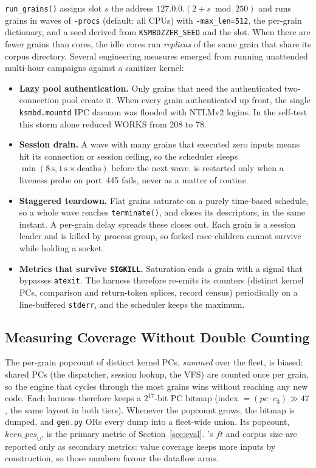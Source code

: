 \documentclass{article}
\begin{document}
\texttt{run\_grains()} assigns slot $s$ the address
$127.0.0.(2 + s \bmod 250)$ and runs grains in waves of \texttt{-procs}
(default: all CPUs) with \texttt{-max\_len=512}, the per-grain dictionary,
and a seed derived from \texttt{KSMBDZZER\_SEED} and the slot. When there
are fewer grains than cores, the idle cores run \emph{replicas} of the same
grain that share its corpus directory. Several engineering measures emerged
from running unattended multi-hour campaigns against a sanitizer kernel:
\begin{itemize}[nosep]
  \item \textbf{Lazy pool authentication.} Only grains that need the
        authenticated two-connection pool create it. When every grain
        authenticated up front, the single \texttt{ksmbd.mountd} IPC daemon
        was flooded with NTLMv2 logins. In the self-test this storm alone
        reduced WORKS from 208 to 78.
  \item \textbf{Session drain.} A wave with many grains that executed zero
        inputs means \ksmbd hit its connection or session ceiling, so the
        scheduler sleeps $\min(8\,\mathrm{s}, 1\,\mathrm{s} \times \text{deaths})$
        before the next wave. \ksmbd is restarted only when a liveness probe
        on port~445 fails, never as a matter of routine.
  \item \textbf{Staggered teardown.} Flat grains saturate on a purely
        time-based schedule, so a whole wave reaches \texttt{terminate()}, and
        closes its \kcovdf descriptors, in the same instant. A per-grain
        delay spreads these closes out. Each grain is a session leader and is
        killed by process group, so forked race children cannot survive while
        holding a \ksmbd socket.
  \item \textbf{Metrics that survive \texttt{SIGKILL}.} Saturation ends a grain
        with a signal that bypasses \texttt{atexit}. The harness therefore
        re-emits its counters (distinct kernel PCs, comparison and
        return-token splices, record census) periodically on a line-buffered
        \texttt{stderr}, and the scheduler keeps the maximum.
\end{itemize}

\subsection{Measuring Coverage Without Double Counting}

The per-grain popcount of distinct kernel PCs, \emph{summed} over the fleet,
is biased: shared PCs (the dispatcher, session lookup, the VFS) are counted
once per grain, so the engine that cycles through the most grains wins
without reaching any new code. Each harness therefore keeps a $2^{17}$-bit
PC bitmap (index $= (\mathit{pc}\cdot c_3) \gg 47$, the same layout in both
tiers). Whenever the popcount grows, the bitmap is dumped, and
\texttt{gen.py} ORs every dump into a fleet-wide union. Its popcount,
$\mathit{kern\_pcs}_\cup$, is the primary metric of
Section~\ref{sec:eval}. \libfuzzer's $\mathit{ft}$ and corpus size are
reported only as secondary metrics: value coverage keeps more inputs by
construction, so those numbers favour the dataflow arms.
\end{document}
